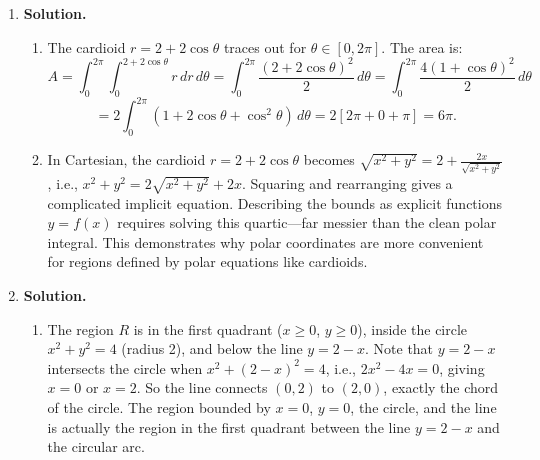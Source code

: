 \begin{enumerate}
\begin{enumerate}
\item Moments:
\[
M_x = \int_0^3\int_0^{x^2}y(5+x)\,dy\,dx = \int_0^3(5+x)\frac{x^4}{2}\,dx = \frac{1}{2}\int_0^3(5x^4+x^5)\,dx
\]
\[
= \frac{1}{2}\left[x^5+\frac{x^6}{6}\right]_0^3 = \frac{1}{2}\left(243+\frac{729}{6}\right) = \frac{1}{2}\cdot\frac{1458+729}{6} = \frac{2187}{12} = \frac{729}{4}.
\]

\[
M_y = \int_0^3\int_0^{x^2}x(5+x)\,dy\,dx = \int_0^3 x(5+x)\cdot x^2\,dx = \int_0^3(5x^3+x^4)\,dx
\]
\[
= \left[\frac{5x^4}{4}+\frac{x^5}{5}\right]_0^3 = \frac{5\cdot81}{4}+\frac{243}{5} = \frac{405}{4}+\frac{243}{5} = \frac{2025+972}{20} = \frac{2997}{20}.
\]

\item Center of mass:
\begin{align*}
\bar{x} &= \frac{M_y}{M} = \frac{2997/20}{261/4} = \frac{2997}{20}\cdot\frac{4}{261} = \frac{2997}{1305}\\
&= \frac{999}{435} = \frac{333}{145}\approx 2.297.
\end{align*}
\[
\bar{y} = \frac{M_x}{M} = \frac{729/4}{261/4} = \frac{729}{261} = \frac{243}{87} = \frac{81}{29}\approx 2.793.
\]
\end{enumerate}

\item \textbf{Solution.}
\begin{enumerate}
\item The cardioid $r = 2+2\cos\theta$ traces out for $\theta\in[0,2\pi]$. The area is:
\[
A = \int_0^{2\pi}\int_0^{2+2\cos\theta}r\,dr\,d\theta = \int_0^{2\pi}\frac{(2+2\cos\theta)^2}{2}\,d\theta = \int_0^{2\pi}\frac{4(1+\cos\theta)^2}{2}\,d\theta
\]
\[
= 2\int_0^{2\pi}(1+2\cos\theta+\cos^2\theta)\,d\theta = 2\left[2\pi+0+\pi\right] = 6\pi.
\]

\item In Cartesian, the cardioid $r=2+2\cos\theta$ becomes $\sqrt{x^2+y^2} = 2 + \frac{2x}{\sqrt{x^2+y^2}}$, i.e., $x^2+y^2 = 2\sqrt{x^2+y^2}+2x$. Squaring and rearranging gives a complicated implicit equation. Describing the bounds as explicit functions $y = f(x)$ requires solving this quartic---far messier than the clean polar integral. This demonstrates why polar coordinates are more convenient for regions defined by polar equations like cardioids.
\end{enumerate}

\item \textbf{Solution.}
\begin{enumerate}
\item The region $R$ is in the first quadrant ($x\ge 0$, $y\ge 0$), inside the circle $x^2+y^2=4$ (radius 2), and below the line $y=2-x$. Note that $y=2-x$ intersects the circle when $x^2+(2-x)^2=4$, i.e., $2x^2-4x=0$, giving $x=0$ or $x=2$. So the line connects $(0,2)$ to $(2,0)$, exactly the chord of the circle. The region bounded by $x=0$, $y=0$, the circle, and the line is actually the region in the first quadrant between the line $y=2-x$ and the circular arc.


\end{enumerate}
\end{enumerate}
